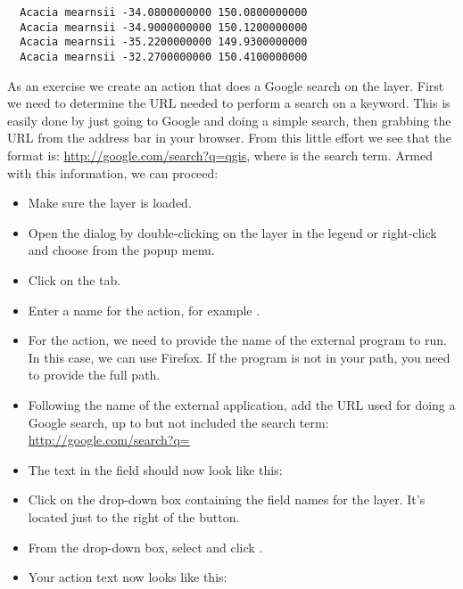 \begin{verbatim}
  Acacia mearnsii -34.0800000000 150.0800000000
  Acacia mearnsii -34.9000000000 150.1200000000
  Acacia mearnsii -35.2200000000 149.9300000000
  Acacia mearnsii -32.2700000000 150.4100000000
\end{verbatim} 

As an exercise we create an action that does a Google search on the 
 layer. First we need to determine the URL needed to perform a search on a
keyword. This is easily done by just going to Google and doing a simple
search, then grabbing the URL from the address bar in your browser. From this
little effort we see that the format is: \url{http://google.com/search?q=qgis},
where  is the search term. Armed with this information, we can
proceed:

\begin{itemize}
\item Make sure the  layer is loaded.
\item Open the  dialog by double-clicking on the layer in the
  legend or right-click and choose  from the popup menu.
\item Click on the  tab.
\item Enter a name for the action, for example .
\item For the action, we need to provide the name of the external program to
  run. In this case, we can use Firefox. If the program is not in
  your path, you need to provide the full path.
\item Following the name of the external application, add the URL used for
  doing a Google search, up to but not included the search term:
  \url{http://google.com/search?q=}
\item The text in the  field should now look like this:\\
\item Click on the drop-down box containing the field names for the
   layer. It's located just to the right of the
   button.
\item From the drop-down box, select  and click .
\item Your action text now looks like this:\\ 
\end{itemize}
 

